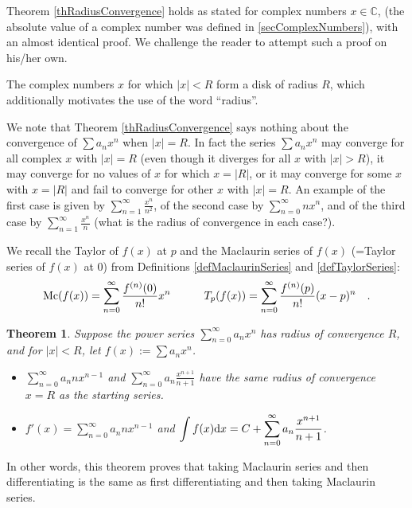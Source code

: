 \documentclass[12pt]{book}
\newtheorem{theorem}{Theorem}[section]
\begin{document}
Theorem \ref{thRadiusConvergence} holds as stated for complex numbers $x\in \mathbb C$, (the absolute value of a complex number was defined in \ref{secComplexNumbers}), with an almost identical proof. We challenge the reader to attempt such a proof on his/her own.

The complex numbers $x$ for which $|x|<R$ form a disk of radius $R$, which additionally motivates the use of the word ``radius''.

We note that Theorem \ref{thRadiusConvergence} says nothing about the convergence of $\sum a_n x^n$ when $|x|=R$. In fact the series $\sum a_n x^n$ may converge for all complex $x$ with $|x|=R$ (even though it diverges for all $x$ with $|x|>R$), it may converge for no values of $x$ for which $x=|R|$, or it may converge for some $x$ with $x=|R|$ and fail to converge for other $x$ with $|x|=R$. An example of the first case is given by $\sum\limits_{n=1}^\infty  \frac{x^n}{n^2}$, of the second case by  $\sum\limits_{n=0}^\infty  nx^n$, and of the third case by $\sum\limits_{n=1}^\infty  \frac{x^n}{n} $ (what is the radius of convergence in each case?).

We recall the Taylor of $f(x)$ at $p$ and the Maclaurin series of $f(x)$ (=Taylor series of $f(x)$ at 0) from Definitions \ref{defMaclaurinSeries} and \ref{defTaylorSeries}:
\[
\operatorname{{\normalfont{Mc}}} (f(x))= \sum\limits _{n=0}^\infty \frac{f^{(n)}(0)}{n!}x^n\quad\quad\quad {\normalfont{T}}_p(f(x))=\sum\limits_{n=0}^\infty \frac{f^{(n)}(p)}{n!}(x-p)^n\quad .
\]

\begin{theorem}\label{thDifferentiatingIntegratingPowerSeriesNonFormal}
Suppose the power series $\sum\limits_{n=0}^\infty a_n x^n$ has radius of convergence $R$, and for $|x|<R$, let $f(x):=\sum a_n x^n$.
\begin{itemize}
\item[(a)] $\sum\limits_{n=0}^\infty a_n n x^{n-1}$ and $\sum\limits_{n=0}^\infty a_n\frac{x^{n+1}}{n+1}$ have the same radius of convergence $x=R$ as the starting series.
\item[(b)] $f'(x)=\sum\limits_{n=0}^\infty a_n n x^{n-1}$ and $\displaystyle\int f(x){\normalfont \text{d}} x= C+\sum\limits_{n=0}^\infty a_n\frac{x^{n+1}}{n+1} $.
\end{itemize}
\end{theorem}
In other words, this theorem proves that taking Maclaurin series and then differentiating is the same as first differentiating and then taking Maclaurin series.
\end{document}
